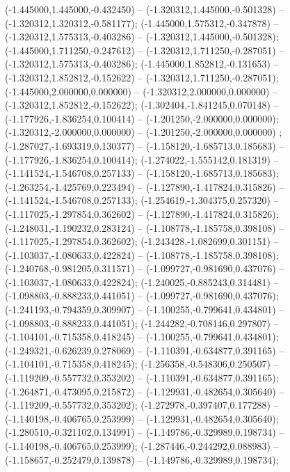  (-1.445000,1.445000,-0.432450) -- (-1.320312,1.445000,-0.501328) -- (-1.320312,1.320312,-0.581177);
 (-1.445000,1.575312,-0.347878) -- (-1.320312,1.575313,-0.403286) -- (-1.320312,1.445000,-0.501328);
 (-1.445000,1.711250,-0.247612) -- (-1.320312,1.711250,-0.287051) -- (-1.320312,1.575313,-0.403286);
 (-1.445000,1.852812,-0.131653) -- (-1.320312,1.852812,-0.152622) -- (-1.320312,1.711250,-0.287051);
 (-1.445000,2.000000,0.000000) -- (-1.320312,2.000000,0.000000) -- (-1.320312,1.852812,-0.152622);
 (-1.302404,-1.841245,0.070148) -- (-1.177926,-1.836254,0.100414) -- (-1.201250,-2.000000,0.000000);
 (-1.320312,-2.000000,0.000000) -- (-1.201250,-2.000000,0.000000) ;
 (-1.287027,-1.693319,0.130377) -- (-1.158120,-1.685713,0.185683) -- (-1.177926,-1.836254,0.100414);
 (-1.274022,-1.555142,0.181319) -- (-1.141524,-1.546708,0.257133) -- (-1.158120,-1.685713,0.185683);
 (-1.263254,-1.425769,0.223494) -- (-1.127890,-1.417824,0.315826) -- (-1.141524,-1.546708,0.257133);
 (-1.254619,-1.304375,0.257320) -- (-1.117025,-1.297854,0.362602) -- (-1.127890,-1.417824,0.315826);
 (-1.248031,-1.190232,0.283124) -- (-1.108778,-1.185758,0.398108) -- (-1.117025,-1.297854,0.362602);
 (-1.243428,-1.082699,0.301151) -- (-1.103037,-1.080633,0.422824) -- (-1.108778,-1.185758,0.398108);
 (-1.240768,-0.981205,0.311571) -- (-1.099727,-0.981690,0.437076) -- (-1.103037,-1.080633,0.422824);
 (-1.240025,-0.885243,0.314481) -- (-1.098803,-0.888233,0.441051) -- (-1.099727,-0.981690,0.437076);
 (-1.241193,-0.794359,0.309907) -- (-1.100255,-0.799641,0.434801) -- (-1.098803,-0.888233,0.441051);
 (-1.244282,-0.708146,0.297807) -- (-1.104101,-0.715358,0.418245) -- (-1.100255,-0.799641,0.434801);
 (-1.249321,-0.626239,0.278069) -- (-1.110391,-0.634877,0.391165) -- (-1.104101,-0.715358,0.418245);
 (-1.256358,-0.548306,0.250507) -- (-1.119209,-0.557732,0.353202) -- (-1.110391,-0.634877,0.391165);
 (-1.264871,-0.473095,0.215872) -- (-1.129931,-0.482654,0.305640) -- (-1.119209,-0.557732,0.353202);
 (-1.272978,-0.397407,0.177288) -- (-1.140198,-0.406765,0.253999) -- (-1.129931,-0.482654,0.305640);
 (-1.280510,-0.321102,0.134991) -- (-1.149786,-0.329989,0.198734) -- (-1.140198,-0.406765,0.253999);
 (-1.287446,-0.244292,0.088983) -- (-1.158657,-0.252479,0.139878) -- (-1.149786,-0.329989,0.198734);
